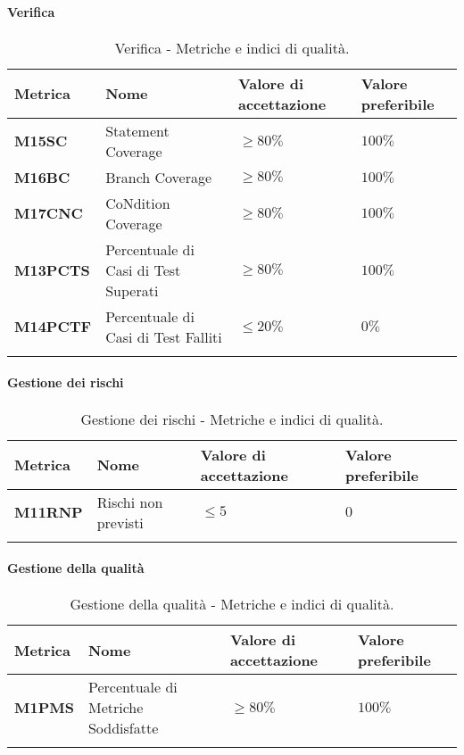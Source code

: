\paragraph{Verifica}
\hspace{1pt}
\begin{longtable}{|C{1.5cm}|L{3cm}|L{2.5cm}|L{2.5cm}|}
    \hline
    \textbf{Metrica} & \textbf{Nome} & \textbf{Valore di accettazione} & \textbf{Valore preferibile} \\
    \hline
    \textbf{M15SC} & Statement Coverage & $\geq 80\%$ & $100\%$ \\
    \hline
    \textbf{M16BC} & Branch Coverage & $\geq 80\%$ & $100\%$ \\
    \hline
    \textbf{M17CNC} & CoNdition Coverage & $\geq 80\%$ & $100\%$ \\
    \hline
    \textbf{M13PCTS} & Percentuale di Casi di Test Superati & $\geq 80\%$ & $100\%$ \\
    \hline
    \textbf{M14PCTF} & Percentuale di Casi di Test Falliti & $\leq 20\%$ & $0\%$ \\
    \hline
\caption{Verifica - Metriche e indici di qualità.}
\label{tab:metriche_testo}
\end{longtable}


\paragraph{Gestione dei rischi}
\hspace{1pt}
    \begin{longtable}{|C{1.5cm}|L{3cm}|L{2.5cm}|L{2.5cm}|}
        \hline
      \textbf{Metrica} & \textbf{Nome} & \textbf{Valore di accettazione} & \textbf{Valore preferibile} \\
      \hline
      \textbf{M11RNP}    & Rischi non previsti  & $\leq 5$ &   $0$ \\
      \hline
    \caption{Gestione dei rischi - Metriche e indici di qualità.}
    \label{tab:tabella2}
\end{longtable}


\paragraph{Gestione della qualità}
\hspace{1pt}
    \begin{longtable}{|C{1.5cm}|L{3cm}|L{2.5cm}|L{2.5cm}|}
        \hline
        \textbf{Metrica} & \textbf{Nome} & \textbf{Valore di accettazione} & \textbf{Valore preferibile} \\
        \hline
        \textbf{M1PMS} & Percentuale di Metriche Soddisfatte & $\geq 80\%$ & $100\%$ \\
        \hline
    \caption{Gestione della qualità - Metriche e indici di qualità.}
    \label{tab:gestione_metriche_testo}
\end{longtable}



